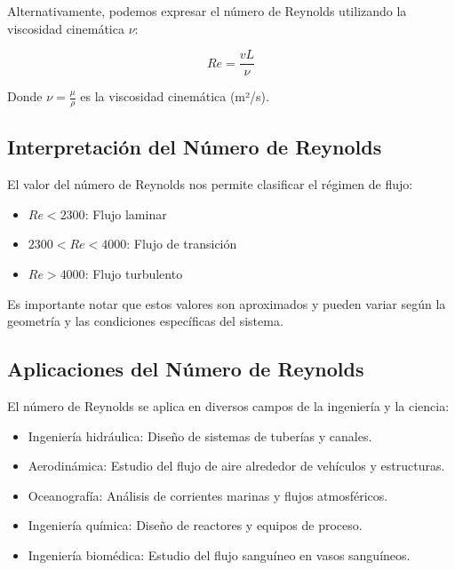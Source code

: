 \documentclass[../main]{subfiles}
\begin{document}
Alternativamente, podemos expresar el número de Reynolds utilizando la viscosidad cinemática $\nu$:

\begin{equation}
    Re = \frac{v L}{\nu}
\end{equation}

Donde $\nu = \frac{\mu}{\rho}$ es la viscosidad cinemática (m²/s).

\subsection{Interpretación del Número de Reynolds}

El valor del número de Reynolds nos permite clasificar el régimen de flujo:

\begin{itemize}
    \item $Re < 2300$: Flujo laminar
    \item $2300 < Re < 4000$: Flujo de transición
    \item $Re > 4000$: Flujo turbulento
\end{itemize}

Es importante notar que estos valores son aproximados y pueden variar según la geometría y las condiciones específicas del sistema.

\subsection{Aplicaciones del Número de Reynolds}

El número de Reynolds se aplica en diversos campos de la ingeniería y la ciencia:

\begin{itemize}
    \item Ingeniería hidráulica: Diseño de sistemas de tuberías y canales.
    \item Aerodinámica: Estudio del flujo de aire alrededor de vehículos y estructuras.
    \item Oceanografía: Análisis de corrientes marinas y flujos atmosféricos.
    \item Ingeniería química: Diseño de reactores y equipos de proceso.
    \item Ingeniería biomédica: Estudio del flujo sanguíneo en vasos sanguíneos.
\end{itemize}
\end{document}
